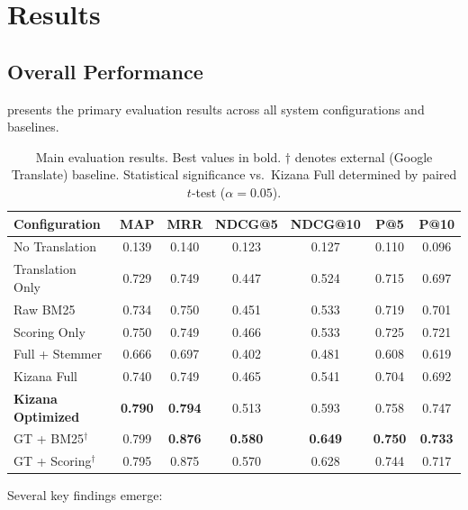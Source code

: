 \documentclass[preprint,12pt,authoryear]{elsarticle}
\begin{document}
\section{Results}
\label{sec:results}

\subsection{Overall Performance}

 presents the primary evaluation results across all system configurations and baselines.

\begin{table}[t]
\centering
\caption{Main evaluation results. Best values in bold. $\dagger$ denotes external (Google Translate) baseline. Statistical significance vs.\ Kizana Full determined by paired $t$-test ($\alpha = 0.05$).}
\label{tab:main-results}
\begin{tabular}{lcccccc}
\toprule
Configuration & MAP & MRR & NDCG@5 & NDCG@10 & P@5 & P@10 \\
\midrule
No Translation & 0.139 & 0.140 & 0.123 & 0.127 & 0.110 & 0.096 \\
Translation Only & 0.729 & 0.749 & 0.447 & 0.524 & 0.715 & 0.697 \\
Raw BM25 & 0.734 & 0.750 & 0.451 & 0.533 & 0.719 & 0.701 \\
Scoring Only & 0.750 & 0.749 & 0.466 & 0.533 & 0.725 & 0.721 \\
Full + Stemmer & 0.666 & 0.697 & 0.402 & 0.481 & 0.608 & 0.619 \\
\midrule
Kizana Full & 0.740 & 0.749 & 0.465 & 0.541 & 0.704 & 0.692 \\
\textbf{Kizana Optimized} & \textbf{0.790} & \textbf{0.794} & 0.513 & 0.593 & 0.758 & 0.747 \\
\midrule
GT + BM25$^\dagger$ & 0.799 & \textbf{0.876} & \textbf{0.580} & \textbf{0.649} & \textbf{0.750} & \textbf{0.733} \\
GT + Scoring$^\dagger$ & 0.795 & 0.875 & 0.570 & 0.628 & 0.744 & 0.717 \\
\bottomrule
\end{tabular}
\end{table}

Several key findings emerge:
\end{document}
